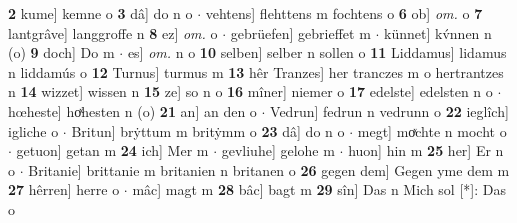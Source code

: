 \documentclass[8pt,a4paper,notitlepage]{article}
\begin{document}
\begin{table}[ht]
\begin{minipage}[t]{0.5\linewidth}
\textbf{2} kume] kemne o \textbf{3} dâ] do n o  $\cdot$ vehtens] flehttens m fochtens o \textbf{6} ob] \textit{om.} o \textbf{7} lantgrâve] langgroffe n \textbf{8} ez] \textit{om.} o  $\cdot$ gebrüefen] gebrieffet m  $\cdot$ künnet] kv́nnen n (o) \textbf{9} doch] Do m  $\cdot$ es] \textit{om.} n o \textbf{10} selben] selber n sollen o \textbf{11} Liddamus] lidamus n liddamús o \textbf{12} Turnus] turmus m \textbf{13} hêr Tranzes] her tranczes m o hertrantzes n \textbf{14} wizzet] wissen n \textbf{15} ze] so n o \textbf{16} mîner] niemer o \textbf{17} edelste] edelsten n o  $\cdot$ hœheste] hoͯhesten n (o) \textbf{21} an] an den o  $\cdot$ Vedrun] fedrun n vedrunn o \textbf{22} ieglîch] igliche o  $\cdot$ Britun] brẏttum m britẏmm o \textbf{23} dâ] do n o  $\cdot$ megt] moͯchte n mocht o  $\cdot$ getuon] getan m \textbf{24} ich] Mer m  $\cdot$ gevliuhe] gelohe m  $\cdot$ huon] hin m \textbf{25} her] Er n o  $\cdot$ Britanie] brittanie m britanien n britanen o \textbf{26} gegen dem] Gegen yme dem m \textbf{27} hêrren] herre o  $\cdot$ mâc] magt m \textbf{28} bâc] bagt m \textbf{29} sîn] Das n Mich sol [*]: Das o \newline
\end{minipage}
\end{table}
\newpage
\end{document}
